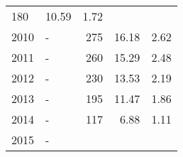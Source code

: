 \begin{longtable}{lXrrr}
       \num{180} &
       \num[round-mode=places,round-precision=2]{10.59} &
         \num[round-mode=places,round-precision=2]{1.72} \\

     2010 &
     \multicolumn{1}{X}{ -  } &


       \num{275} &
       \num[round-mode=places,round-precision=2]{16.18} &
         \num[round-mode=places,round-precision=2]{2.62} \\

     2011 &
     \multicolumn{1}{X}{ -  } &


       \num{260} &
       \num[round-mode=places,round-precision=2]{15.29} &
         \num[round-mode=places,round-precision=2]{2.48} \\

     2012 &
     \multicolumn{1}{X}{ -  } &


       \num{230} &
       \num[round-mode=places,round-precision=2]{13.53} &
         \num[round-mode=places,round-precision=2]{2.19} \\

     2013 &
     \multicolumn{1}{X}{ -  } &


       \num{195} &
       \num[round-mode=places,round-precision=2]{11.47} &
         \num[round-mode=places,round-precision=2]{1.86} \\

     2014 &
     \multicolumn{1}{X}{ -  } &


       \num{117} &
       \num[round-mode=places,round-precision=2]{6.88} &
         \num[round-mode=places,round-precision=2]{1.11} \\

     2015 &
     \multicolumn{1}{X}{ -  } &



\end{longtable}
